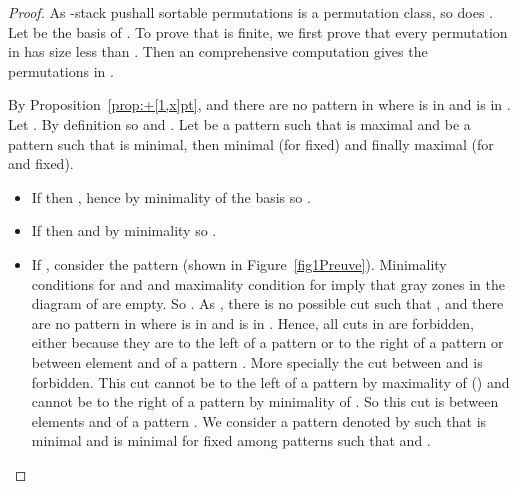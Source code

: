 \documentclass[11pt]{article}
\newcommand{\pushall}{-stack pushall sortable\xspace}
\begin{document}
\begin{proof}
As \pushall permutations is a permutation class, so does . 
Let  be the basis of . 
To prove that  is finite, we first prove that every permutation in  has size less than . 
Then an comprehensive computation gives the permutations in .

By Proposition~\ref{prop:+[1,x]pt},  and there are no pattern  in  where  is in  and  is in . 
Let . 
By definition  so  and . 
Let  be a pattern  such that  is maximal and  be a pattern  such that  is minimal, then  minimal (for  fixed) and finally  maximal (for  and  fixed).
\begin{itemize}
\item If  then , hence by minimality of the basis  so .
\item If  then  and by minimality  so .
\item If , consider the pattern  (shown in Figure~\ref{fig1Preuve}). 
Minimality conditions for  and  and maximality condition for  imply that gray zones in the diagram of  are empty. 
So . 
As , there is no possible cut  such that ,  and there are no pattern  in  where  is in  and  is in . 
Hence, all cuts in  are forbidden, either because they are to the left of a  pattern or to the right of a  pattern or between element  and  of a pattern . 
More specially the cut between  and  is forbidden. 
This cut cannot be to the left of a pattern  by maximality of  () and cannot be to the right of a pattern  by minimality of . 
So this cut is between elements  and  of a pattern . 
We consider a pattern  denoted by  such that  is minimal and  is minimal for  fixed among patterns  such that  and .


\end{itemize}
\end{proof}
\end{document}
